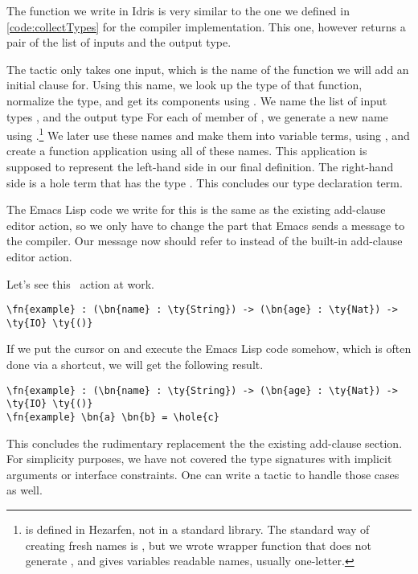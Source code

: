 The  function we write in Idris is very similar to the one we
defined in \autoref{code:collectTypes} for the compiler implementation. 
This one, however returns a pair of the list of inputs and the output type.

The  tactic only takes one input, which is the name of the function
we will add an initial clause for.
Using this name, we look up the type of that function,
normalize the type, and get its components
using .
We name the list of input types , and the output type 
For each of member of , we generate a new name using
.\footnote{ is defined in Hezarfen, not in a standard
library. The standard way of creating fresh names is , but we wrote
wrapper function  that does not generate , and gives variables
readable names, usually one-letter.} We later use these names and make them
into variable terms, using , and create a function application using
all of these names. This application is supposed to represent the left-hand
side in our final definition. The right-hand side is a hole term that has the
type .  This concludes our type declaration term.

The Emacs Lisp code we write for this is the same as the existing add-clause
editor action, so we only have to change the part that Emacs sends a message to
the compiler. Our message now should refer to  instead of the
built-in add-clause editor action.

Let's see this \Elab\ action at work.

\begin{Verbatim}
\fn{example} : (\bn{name} : \ty{String}) -> (\bn{age} : \ty{Nat}) -> \ty{IO} \ty{()}
\end{Verbatim}

If we put the cursor on  and execute the Emacs Lisp code somehow,
which is often done via a shortcut, we will get the following result.

\begin{Verbatim}
\fn{example} : (\bn{name} : \ty{String}) -> (\bn{age} : \ty{Nat}) -> \ty{IO} \ty{()}
\fn{example} \bn{a} \bn{b} = \hole{c}
\end{Verbatim}

This concludes the rudimentary replacement the the existing add-clause section.
For simplicity purposes, we have not covered the type signatures with implicit
arguments or interface constraints. One can write a tactic to handle
those cases as well.

